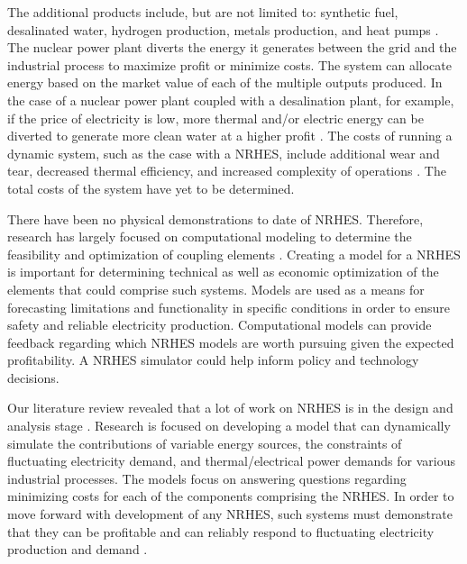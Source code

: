 \documentclass{article}                                                                           %
\begin{document}
\begin{linenumbers}
The additional products include, but are not limited to: synthetic fuel, desalinated water, hydrogen production, metals production, and heat pumps \cite{Bienvenue2015}. The nuclear power plant diverts the energy it generates between the grid and the industrial process to maximize profit or minimize costs. The system can allocate energy based on the market value of each of the multiple outputs produced. In the case of a nuclear power plant coupled with a desalination plant, for example, if the price of electricity is low, more thermal and/or electric energy can be diverted to generate more clean water at a higher profit \cite {Chen2016}. The costs of running a dynamic system, such as the case with a NRHES, include additional wear and tear, decreased thermal efficiency, and increased complexity of operations \cite{Garcia2013}. The total costs of the system have yet to be determined.

There have been no physical demonstrations to date of NRHES. Therefore, research has largely focused on computational modeling to determine the feasibility and optimization of coupling elements \cite{Boardman2013, Shropshire2012}. Creating a model for a NRHES is important for determining technical as well as economic optimization of the elements that could comprise such systems. Models are used as a means for forecasting limitations and functionality in specific conditions in order to ensure safety and reliable electricity production. Computational models can provide feedback regarding which NRHES models are worth pursuing given the expected profitability. A NRHES simulator could help inform policy and technology decisions.

Our literature review revealed that a lot of work on NRHES is in the design and analysis stage \cite{Boardman2013, Shropshire2012}. Research is focused on developing a model that can dynamically simulate the contributions of variable energy sources, the constraints of fluctuating electricity demand, and thermal/electrical power demands for various industrial processes. The models focus on answering questions regarding minimizing costs for each of the components comprising the NRHES. In order to move forward with development of any NRHES,  such systems must demonstrate that they can be profitable and can reliably respond to fluctuating electricity production and demand \cite{Rabiti2015}.


\end{linenumbers}
\end{document}
